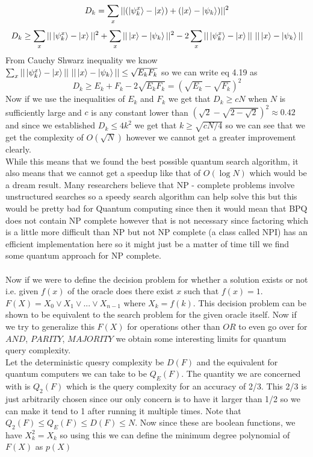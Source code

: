 \documentclass{report}
\begin{document}
\begin{equation}D_k = \sum_{x}||(\ket{\psi_{k}^{x}} - \ket{x}) + (\ket{x} - \ket{\psi_{k}})||^2\end{equation}
\begin{equation}D_k \geq \sum_{x}||\ket{\psi_{k}^{x}} - \ket{x}||^2 + \sum_{x}||\ket{x} - \ket{\psi_{k}}||^2 - 2\sum_{x}||\ket{\psi_{k}^{x}} - \ket{x}||\text{ }||\ket{x} - \ket{\psi_{k}}||\end{equation}
From Cauchy Shwarz inequality we know $\sum_{x}||\ket{\psi_{k}^{x}} - \ket{x}||\text{ }||\ket{x} - \ket{\psi_{k}}|| \leq \sqrt{E_kF_k}$ so we can write eq 4.19 as
\begin{equation}D_k \geq E_k + F_k - 2\sqrt{E_kF_k} = (\sqrt{E_k} - \sqrt{F_k})^2\end{equation}
Now if we use the inequalities of $E_k$ and $F_k$ we get that $D_k \geq cN$ when $N$ is sufficiently large and $c$ is any constant lower than $(\sqrt{2} - \sqrt{2 - \sqrt{2}})^2 \approx 0.42$ and since we established $D_k \leq 4k^2$ we get that $k \geq \sqrt{cN/4}$ so we can see that we get the complexity of $O(\sqrt{N})$ however we cannot get a greater improvement clearly.\\
While this means that we found the best possible quantum search algorithm, it also means that we cannot get a speedup like that of $O(\log N)$ which would be a dream result. Many researchers believe that NP - complete problems involve unstructured searches so a speedy search algorithm can help solve this but this would be pretty bad for Quantum computing since then it would mean that BPQ does not contain NP complete however that is not necessary since factoring which is a little more difficult than NP but not NP complete (a class called NPI) has an efficient implementation here so it might just be a matter of time till we find some quantum approach for NP complete.\\\\
Now if we were to define the decision problem for whether a solution exists or not i.e. given $f(x)$ of the oracle does there exist $x$ such that $f(x) = 1$. $F(X) = X_0 \vee X_1 \vee ... \vee X_{n-1}$ where $X_k = f(k)$. This decision problem can be shown to be equivalent to the search problem for the given oracle itself. Now if we try to generalize this $F(X)$ for operations other than $OR$ to even go over for $AND$, $PARITY$, $MAJORITY$ we obtain some interesting limits for quantum query complexity.\\
Let the deterministic quesry complexity be $D(F)$ and the equivalent for quantum computers we can take to be $Q_E(F)$. The quantity we are concerned with is $Q_2(F)$ which is the query complexity for an accuracy of 2/3. This 2/3 is just arbitrarily chosen since our only concern is to have it larger than 1/2 so we can make it tend to 1 after running it multiple times. Note that $Q_2(F) \leq Q_E(F) \leq D(F) \leq N$. Now since these are boolean functions, we have $X_{k}^{2} = X_{k}$ so using this we can define the minimum degree polynomial of $F(X)$ as $p(X)$
\end{document}
